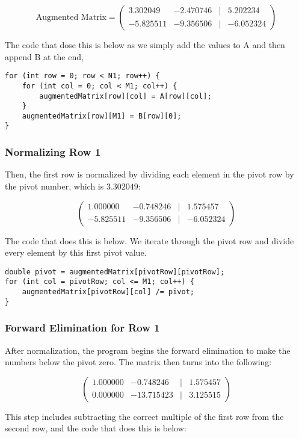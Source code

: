 \documentclass[a4paper]{article}
\begin{document}
\[
\text{Augmented Matrix} = \begin{pmatrix}
3.302049 & -2.470746 & | & 5.202234 \\
-5.825511 & -9.356506 & | & -6.052324
\end{pmatrix}
\]

The code that dose this is below as we simply add the values to A and then append B at the end, 
\begin{verbatim}
for (int row = 0; row < N1; row++) {
    for (int col = 0; col < M1; col++) {
        augmentedMatrix[row][col] = A[row][col];
    }
    augmentedMatrix[row][M1] = B[row][0];
}
\end{verbatim}

\subsubsection{Normalizing Row 1}
Then, the first row is normalized by dividing each element in the pivot row by the pivot number, which is \(3.302049\):

\[
\begin{pmatrix}
1.000000 & -0.748246 & | & 1.575457 \\
-5.825511 & -9.356506 & | & -6.052324
\end{pmatrix}
\]

The code that does this is below. We iterate through the pivot row and divide every element by this first pivot value.

\begin{verbatim}
double pivot = augmentedMatrix[pivotRow][pivotRow];
for (int col = pivotRow; col <= M1; col++) {
    augmentedMatrix[pivotRow][col] /= pivot;
}
\end{verbatim}

\subsubsection{Forward Elimination for Row 1}
After normalization, the program begins the forward elimination to make the numbers below the pivot zero. The matrix then turns into the following:

\[
\begin{pmatrix}
1.000000 & -0.748246 & | & 1.575457 \\
0.000000 & -13.715423 & | & 3.125515
\end{pmatrix}
\]

This step includes subtracting the correct multiple of the first row from the second row, and the code that does this is below:
\end{document}
